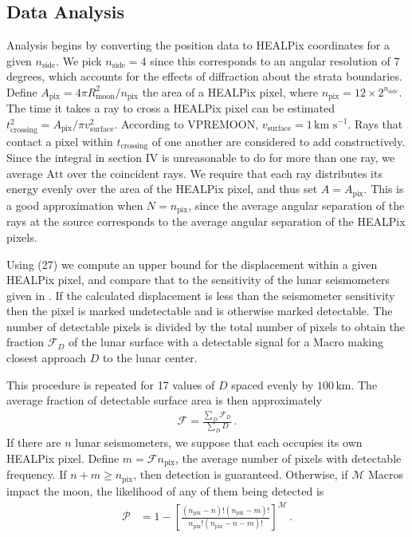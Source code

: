 \documentclass[prd,reprint,10pt]{revtex4-1}
\newcommand*\scr[1]{\mathscr{#1}}
\newcommand*\te[1]{\text{#1}}
\newcommand*\ps[1]{\left[#1\right]}
\newcommand*\f[2]{\frac{#1}{#2}}
\begin{document}
\subsection{Data Analysis}
Analysis begins by converting the position data to HEALPix coordinates for a given $n_\te{side}$. We pick $n_\te{side} = 4$ since this corresponds to an angular resolution of 7 degrees, which accounts for the effects of diffraction about the strata boundaries. Define $A_\te{pix} = 4\pi R_\te{moon}^2/n_\te{pix}$ the area of a HEALPix pixel, where $n_\te{pix} = 12\times 2^{n_{\te{side}}}$. The time it takes a ray to cross a HEALPix pixel can be estimated $t_\te{crossing}^2 = A_\te{pix}/\pi v_\te{surface}^2$. According to VPREMOON, $v_\te{surface} = 1\,\te{km s}^{-1}$. Rays that contact a pixel within $t_\te{crossing}$ of one another are considered to add constructively. Since the integral in section IV is unreasonable to do for more than one ray, we average $\te{Att}$ over the coincident rays. We require that each ray distributes its energy evenly over the area of the HEALPix pixel, and thus set $A = A_\te{pix}$. This is a good approximation when $N=n_\te{pix}$, since the average angular separation of the rays at the source corresponds to the average angular separation of the HEALPix pixels.

Using (27) we compute an upper bound for the displacement within a given HEALPix pixel, and compare that to the sensitivity of the lunar seismometers given in \cite{latham1973lunar}. If the calculated displacement is less than the seismometer sensitivity then the pixel is marked undetectable and is otherwise marked detectable. The number of detectable pixels is divided by the total number of pixels to obtain the fraction $\scr F_D$ of the lunar surface with a detectable signal for a Macro making closest approach $D$ to the lunar center.

This procedure is repeated for 17 values of $D$ spaced evenly by $100\,\te{km}$. The average fraction of detectable surface area is then approximately
\begin{align}
\scr F =\f{\sum_D \scr F_D}{\sum_D D}\,.
\end{align}
If there are $n$ lunar seismometers, we suppose that each occupies its own HEALPix pixel. Define $m = \scr Fn_\te{pix}$, the average number of pixels with detectable frequency. If $n+m\geq n_\te{pix}$, then detection is guaranteed. Otherwise, if $\scr M$ Macros impact the moon, the likelihood of any of them being detected is
\begin{align}
\scr P &= 1-\ps{\f{(n_\te{pix}-n)!(n_\te{pix}-m)!}{n_\te{pix}!(n_\te{pix}-n-m)!}}^{\scr M}\,.
\end{align}
\end{document}
